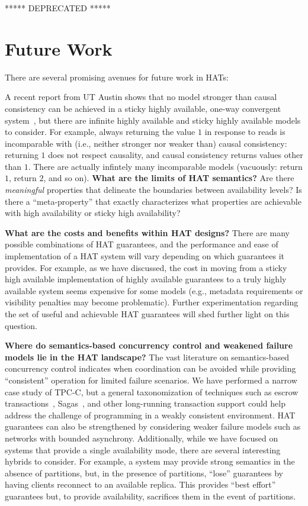 

*****
DEPRECATED
*****

\section{Future Work}
\label{sec:futurework}

There are several promising avenues for future work in HATs:

 A recent report from UT Austin shows that no model stronger than
 causal consistency can be achieved in a sticky highly available,
 one-way convergent system~\cite{cac}, but there are infinite highly
 available and sticky highly available models to consider. For
 example, always returning the value $1$ in response to reads is
 incomparable with (i.e., neither stronger nor weaker than) causal
 consistency: returning $1$ does not respect causality, and causal
 consistency returns values other than $1$. There are actually
 infintely many incomparable models (vacuously: return $1$, return
 $2$, and so on). \textbf{What are the limits of HAT semantics?}  Are
 there \textit{meaningful} properties that delineate the boundaries
 between availability levels?  Is there a ``meta-property'' that
 exactly characterizes what properties are achievable with high
 availability or sticky high availability?

\textbf{What are the costs and benefits within HAT designs?} There are
many possible combinations of HAT guarantees, and the performance and
ease of implementation of a HAT system will vary depending on which
guarantees it provides. For example, as we have discussed, the cost in
moving from a sticky high available implementation of highly available
guarantees to a truly highly available system seems expensive for some
models (e.g., metadata requirements or visibility penalties may
become problematic). Further experimentation regarding the set of
useful and achievable HAT guarantees will shed further light on this
question.

\textbf{Where do semantics-based concurrency control and weakened
  failure models lie in the HAT landscape?} The vast literature on
semantics-based concurrency control indicates when coordination can be
avoided while providing ``consistent'' operation for limited failure
scenarios. We have performed a narrow case study of TPC-C, but a
general taxonomization of techniques such as escrow
transactions~\cite{escrow}, Sagas~\cite{sagas}, and other long-running
transaction support could help address the challenge of programming in
a weakly consistent environment. HAT guarantees can also be
strengthened by considering weaker failure models such as networks
with bounded asynchrony. Additionally, while we have focused on
systems that provide a single availability mode, there are several
interesting hybrids to consider. For example, a system may provide
strong semantics in the absence of partitions, but, in the presence of
partitions, ``lose'' guarantees by having clients reconnect to an
available replica. This provides ``best effort'' guarantees but, to
provide availability, sacrifices them in the event of partitions.
